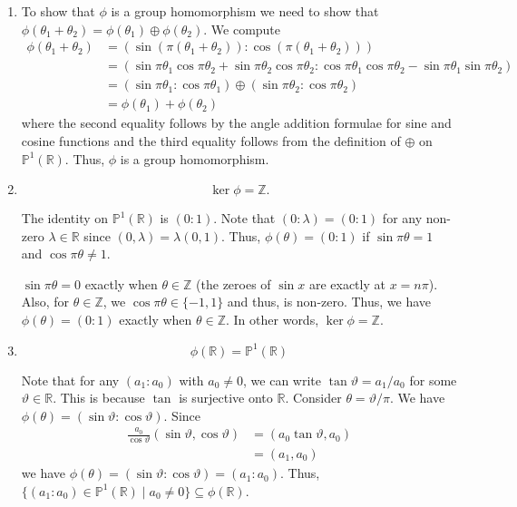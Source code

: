 \documentclass[12 pt, letterpaper]{hmcpset}
\begin{document}
\begin{solution}
	\begin{enumerate}
		\item To show that $\phi$ is a group homomorphism we need to show that $\phi(\theta_{1} + \theta_{2}) = \phi(\theta_{1}) \oplus \phi(\theta_{2})$. We compute
			\[
				\begin{split}
					\phi(\theta_{1} + \theta_{2}) & = (\sin{(\pi(\theta_{1} + \theta_{2}))} : \cos{(\pi(\theta_{1} + \theta_{2}))}) \\
								      & = (\sin{\pi \theta_{1}} \cos{\pi \theta_{2}} + \sin{\pi \theta_{2}} \cos{\pi \theta_{2}} : \cos{\pi \theta_{1}} \cos{\pi \theta_{2}} - \sin{\pi \theta_{1}} \sin{\pi \theta_{2}}) \\
								      & = (\sin{\pi \theta_{1}} : \cos{\pi \theta_{1}}) \oplus (\sin{\pi \theta_{2}} : \cos{\pi \theta_{2}}) \\
								      & = \phi(\theta_{1}) + \phi(\theta_{2})
				\end{split}
			\]
			where the second equality follows by the angle addition formulae for sine and cosine functions and the third equality follows from the definition of $\oplus$ on $\mathbb{P}^{1}(\mathbb{R})$. Thus, $\phi$ is a group homomorphism.
		\item
			\[
				\boxed{
					\ker \phi = \mathbb{Z}.
				}
			\]

			The identity on $\mathbb{P}^{1}(\mathbb{R})$ is $(0 : 1)$. Note that $(0 : \lambda) = (0 : 1)$ for any non-zero $\lambda \in \mathbb{R}$ since $(0, \lambda) = \lambda (0, 1)$. Thus, $\phi(\theta) = (0 : 1)$ if $\sin{\pi \theta} = 1$ and $\cos{\pi \theta} \neq 1$.

			$\sin{\pi \theta} = 0$ exactly when $\theta \in \mathbb{Z}$ (the zeroes of $\sin{x}$ are exactly at $x = n \pi$). Also, for $\theta \in \mathbb{Z}$, we $\cos{\pi \theta} \in \{ -1, 1 \}$ and thus, is non-zero. Thus, we have $\phi(\theta) = (0 : 1)$ exactly when $\theta \in \mathbb{Z}$. In other words, $\ker \phi = \mathbb{Z}$.
		\item
			\[
				\boxed{
					\phi(\mathbb{R}) = \mathbb{P}^{1}(\mathbb{R})
				}
			\]

			Note that for any $(a_{1} : a_{0})$ with $a_{0} \neq 0$, we can write $\tan{\vartheta} = a_{1} / a_{0}$ for some $\vartheta \in \mathbb{R}$. This is because $\tan$ is surjective onto $\mathbb{R}$. Consider $\theta = \vartheta / \pi$. We have $\phi(\theta) = (\sin{\vartheta} : \cos{\vartheta})$. Since
			\[
				\begin{split}
					\frac{a_{0}}{\cos{\vartheta}} (\sin{\vartheta}, \cos{\vartheta}) & = (a_{0} \tan{\vartheta}, a_{0}) \\
												  & = (a_{1}, a_{0})
				\end{split}
			\]
			we have $\phi(\theta) = (\sin{\vartheta} : \cos{\vartheta}) = (a_{1} : a_{0})$. Thus, $\{ (a_{1} : a_{0}) \in \mathbb{P}^{1}(\mathbb{R}) \mid a_{0} \neq 0 \} \subseteq \phi(\mathbb{R})$.


\end{enumerate}
\end{solution}
\end{document}
